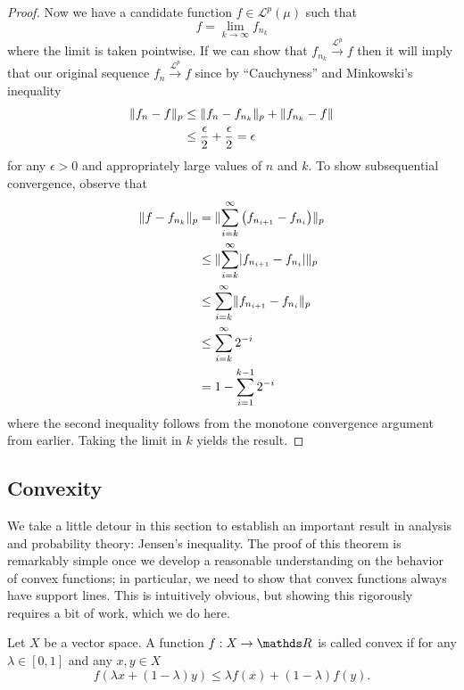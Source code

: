 \begin{proof}
Now we have a candidate function $f\in\mathcal{L}^{p}\left(\mu\right)$
such that 
\[
f=\lim_{k\to\infty}f_{n_{k}}
\]
where the limit is taken pointwise. If we can show that $f_{n_{k}}\stackrel{\mathcal{L}^{p}}{\longrightarrow}f$
then it will imply that our original sequence $f_{n}\stackrel{\mathcal{L}^{p}}{\longrightarrow}f$
since by ``Cauchyness'' and Minkowski's inequality
\begin{align*}
\lVert f_{n}-f\rVert_{p} & \leq\lVert f_{n}-f_{n_{k}}\rVert_{p}+\lVert f_{n_{k}}-f\rVert_{}\\
 & \leq\frac{\epsilon}{2}+\frac{\epsilon}{2}=\epsilon
\end{align*}
for any $\epsilon>0$ and appropriately large values of $n$ and $k.$
To show subsequential convergence, observe that 
\begin{align*}
\lVert f-f_{n_{k}}\rVert_{p} & =\lVert\sum_{i=k}^{\infty}\left(f_{n_{i+1}}-f_{n_{i}}\right)\rVert_{p}\\
 & \leq\lVert\sum_{i=k}^{\infty}\lvert f_{n_{i+1}}-f_{n_{i}}\rvert\rVert_{p}\\
 & \leq\sum_{i=k}^{\infty}\lVert f_{n_{i+1}}-f_{n_{i}}\rVert_{p}\\
 & \leq\sum_{i=k}^{\infty}2^{-i}\\
 & =1-\sum_{i=1}^{k-1}2^{-i}
\end{align*}
where the second inequality follows from the monotone convergence
argument from earlier. Taking the limit in $k$ yields the result.
\end{proof}

\subsection{Convexity}

We take a little detour in this section to establish an important
result in analysis and probability theory: Jensen's inequality. The
proof of this theorem is remarkably simple once we develop a reasonable
understanding on the behavior of convex functions; in particular,
we need to show that convex functions always have support lines. This
is intuitively obvious, but showing this rigorously requires a bit
of work, which we do here.
\begin{defn}
\label{def:convexFunction}Let $X$ be a vector space. A function
$f:X\to\R$ is called convex if for any $\lambda\in\left[0,1\right]$
and any $x,y\in X$
\[
f\left(\lambda x+\left(1-\lambda\right)y\right)\leq\lambda f\left(x\right)+\left(1-\lambda\right)f\left(y\right).
\]
\end{defn}

